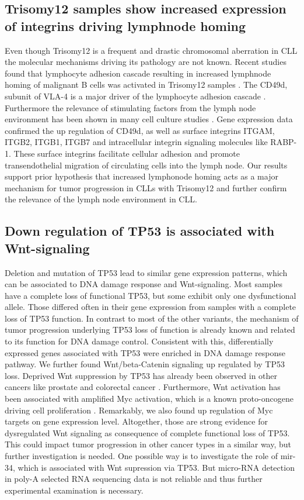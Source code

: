 \subsection{Trisomy12 samples show increased expression of integrins driving lymphnode homing}
Even though Trisomy12 is a frequent and drastic chromosomal aberration in CLL the molecular mechanisms driving its pathology are not known. Recent studies found that lymphocyte adhesion cascade resulting in increased lymphnode homing of malignant B cells was activated in Trisomy12 samples \citep{Riches2014,Ganghammer2015}. The CD49d, subunit of VLA-4 is a major driver of the lymphocyte adhesion cascade \citep{Strati2017}. Furthermore the relevance of stimulating factors from the lymph node environment has been shown in many cell culture studies \citep{Hacken2016}. Gene expression data confirmed the up regulation of CD49d, as well as surface integrins ITGAM, ITGB2, ITGB1, ITGB7 and intracellular integrin signaling molecules like RABP-1. These surface integrins facilitate cellular adhesion and promote transendothelial migration of circulating cells into the lymph node. Our results support prior hypothesis that increased lymphonode homing acts as a major mechanism for tumor progression in CLLs with Trisomy12 and further confirm the relevance of the lymph node environment in CLL.         


\subsection{Down regulation of TP53 is associated with Wnt-signaling}
Deletion and mutation of TP53 lead to similar gene expression patterns, which can be associated to DNA damage response and Wnt-signaling. Most samples have a complete loss of functional TP53, but some exhibit only one dysfunctional allele. Those differed often in their gene expression from samples with a complete loss of TP53 function. In contrast to most of the other variants, the mechanism of tumor progression underlying TP53 loss of function is already known and related to its function for DNA damage control. Consistent with this, differentially expressed genes associated with TP53 were enriched in DNA damage response pathway. We further found Wnt/beta-Catenin signaling up regulated by TP53 loss. Deprived Wnt suppression by TP53 has already been observed in other cancers like prostate and colorectal cancer \citep{Kim2011a}. Furthermore, Wnt activation has been associated with amplified Myc activation, which is a known proto-oncogene driving cell proliferation \citep{Rennoll2015}. Remarkably, we also found up regulation of Myc targets on gene expression level. Altogether, those are strong evidence for dysregulated Wnt signaling as consequence of complete functional loss of TP53. This could impact tumor progression in other cancer types in a similar way, but further investigation is needed. One possible way is to investigate the role of mir-34, which is associated with Wnt supression via TP53. But micro-RNA detection in poly-A selected RNA sequencing data is not reliable and thus further experimental examination is necessary.         


